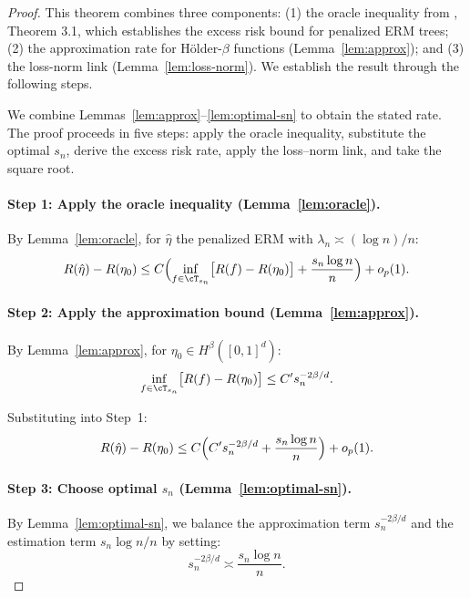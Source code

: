 


\begin{proof}
This theorem combines three components: (1) the oracle inequality from \citet{xuStatisticalOptimalityOptimal2026}, Theorem 3.1, which establishes the excess risk bound for penalized ERM trees; (2) the approximation rate for Hölder-$\beta$ functions (Lemma~\ref{lem:approx}); and (3) the loss-norm link (Lemma~\ref{lem:loss-norm}). We establish the result through the following steps.

We combine Lemmas~\ref{lem:approx}--\ref{lem:optimal-sn} to obtain the stated rate. The proof proceeds in five steps: apply the oracle inequality, substitute the optimal $s_n$, derive the excess risk rate, apply the loss--norm link, and take the square root.

\paragraph{Step 1: Apply the oracle inequality (Lemma~\ref{lem:oracle}).}
By Lemma~\ref{lem:oracle}, for $\hat\eta$ the penalized ERM with $\lambda_n \asymp (\log n)/n$:
\[
R(\hat\eta) - R(\eta_0) \le C \Bigl( \inf_{f \in \cT_{s_n}} \bigl[ R(f) - R(\eta_0) \bigr] + \frac{s_n \log n}{n} \Bigr) + o_p(1).
\]

\paragraph{Step 2: Apply the approximation bound (Lemma~\ref{lem:approx}).}
By Lemma~\ref{lem:approx}, for $\eta_0 \in H^\beta([0,1]^d)$:
\[
\inf_{f \in \cT_{s_n}} \bigl[ R(f) - R(\eta_0) \bigr] \le C' s_n^{-2\beta/d}.
\]

Substituting into Step~1:
\[
R(\hat\eta) - R(\eta_0) \le C \Bigl( C' s_n^{-2\beta/d} + \frac{s_n \log n}{n} \Bigr) + o_p(1).
\]

\paragraph{Step 3: Choose optimal $s_n$ (Lemma~\ref{lem:optimal-sn}).}
By Lemma~\ref{lem:optimal-sn}, we balance the approximation term $s_n^{-2\beta/d}$ and the estimation term $s_n \log n / n$ by setting:
\[
s_n^{-2\beta/d} \asymp \frac{s_n \log n}{n}.
\]


\end{proof}
